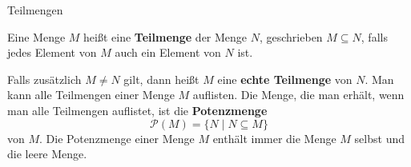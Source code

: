 \documentclass[../../main.tex]{subfiles}
\begin{document}
\begin{nutshell}{Teilmengen}

    Eine Menge $M$ heißt eine \textbf{Teilmenge} der Menge $N$, geschrieben $M\subseteq N$, falls jedes Element von $M$ auch ein Element von $N$ ist.

    Falls zusätzlich $M\neq N$ gilt, dann heißt $M$ eine \textbf{echte Teilmenge} von $N$. Man kann alle Teilmengen einer Menge $M$ auflisten. Die Menge, die man erhält, wenn man alle Teilmengen auflistet, ist die \textbf{Potenzmenge}
    \[\mathcal{P}(M)=\{N\mid N\subseteq M\}\]
    von $M$. Die Potenzmenge einer Menge $M$ enthält immer die Menge $M$ selbst und die leere Menge.
\end{nutshell}
\end{document}
